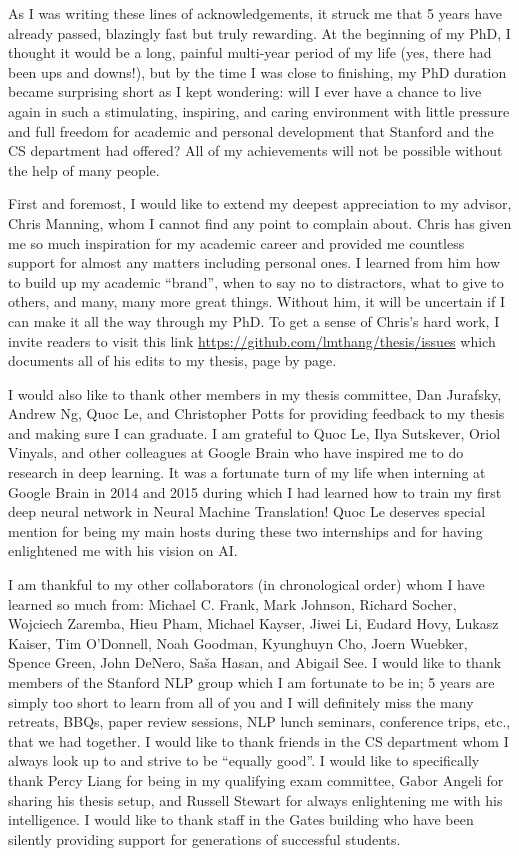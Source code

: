 As I was writing these lines of acknowledgements, it struck me that 5 years have
already passed, blazingly fast but truly rewarding. At the beginning of my PhD,
I thought it would be a long, painful multi-year period of my life (yes, there
had been ups and downs!), but by the time I was close to finishing, my PhD
duration became surprising short as I kept wondering: will I ever have a chance
to live again in such a stimulating, inspiring, and caring environment with
little pressure and full freedom for academic and personal development that
Stanford and the CS department had offered? All of my achievements will not be
possible without the help of many people.

First and foremost, I would like to extend my deepest appreciation to my
advisor, Chris Manning, whom I cannot find any point to complain about. Chris
has given me so much inspiration for my academic career and provided me
countless support for almost any matters including personal ones. I learned from
him how to build up my academic ``brand'', when to say no to distractors,
what to give to others, and many, many more great things.
Without him, it will be uncertain
if I can make it all the way through my PhD. To get a sense of Chris's hard work,
I invite readers to visit this link
\url{https://github.com/lmthang/thesis/issues} which documents all of his edits
to my thesis, page by page.

I would also like to thank other members in my thesis committee, Dan Jurafsky,
Andrew Ng, Quoc Le, and Christopher Potts for providing feedback to my thesis
and making sure I can graduate. I am grateful to Quoc Le, Ilya Sutskever,
Oriol Vinyals, and other colleagues at Google Brain who have inspired me to do
research in deep learning. It was a fortunate turn of my life when interning at
Google Brain in 2014 and 2015 during which I had learned how to train my first
deep neural network in Neural Machine Translation! Quoc Le deserves special
mention for being my main hosts during these two internships and for having
enlightened me with his vision on AI.


I am thankful to my other collaborators (in chronological order) whom I have
learned so much from: Michael C. Frank, Mark Johnson, Richard Socher, Wojciech
Zaremba, Hieu Pham, Michael Kayser, Jiwei Li, Eudard Hovy, Lukasz Kaiser, Tim
O'Donnell, Noah Goodman, Kyunghuyn Cho, Joern Wuebker, Spence Green, John
DeNero, Sa\v{s}a Hasan, and Abigail See. I would like to thank members of the
Stanford NLP group which I am fortunate to be in; 5 years are simply too short
to learn from all of you and I will definitely miss the many retreats, BBQs,
paper review sessions, NLP lunch seminars, conference trips, etc., that we had
together. I would like to thank friends in the CS department whom I always look
up to and strive to be ``equally good''. I would like to specifically thank Percy
Liang for being in my qualifying exam committee, Gabor Angeli for sharing his
thesis setup, and Russell Stewart for always
enlightening me with his intelligence. I would like to thank staff in the Gates
building who have been silently providing support for generations of successful
students.

